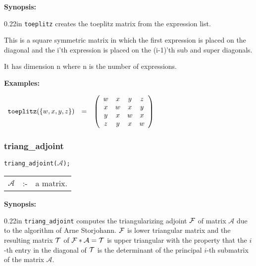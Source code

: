 {\bf Synopsis:} %

\begin{addtolength}{\leftskip}{0.22in}
{\tt toeplitz} creates the toeplitz matrix from the 
                expression list. 

This is a square symmetric matrix in 
                which the first expression is placed on the diagonal 
                and the i'th expression is placed on the (i-1)'th sub 
                and super diagonals.

It has dimension n where n is the 
                number of expressions.

\end{addtolength}

{\bf Examples:}

\begin{flushleft}  
\hspace*{0.1in}
\begin{math}  
\begin{array}{ccc}
{\tt toeplitz}(\{w,x,y,z\}) & = & 
        \left( \begin{array}{cccc} w & x & y & z \\ x & w & x & y \\
      y & x & w & x \\ z & y & x & w
 \end{array} \right) 
\end{array}
\end{math}  
\end{flushleft}

\subsubsection{triang\_adjoint}
\label{linalg:triang_adjoint}
\hspace*{0.175in} {\tt triang\_adjoint($\mathcal{A}$);}

\hspace*{0.1in}
\begin{tabular}{l l l}
$\mathcal{A}$  &:-& a matrix.
\end{tabular}

{\bf Synopsis:} %


\begin{addtolength}{\leftskip}{0.22in}
{\tt triang\_adjoint} computes the triangularizing adjoint ${\cal F}$ of
matrix $\mathcal{A}$ due to the algorithm of Arne Storjohann. ${\cal F}$ is
lower triangular matrix and the resulting matrix ${\cal T}$ of
${\cal F * A = T}$ is upper triangular with the property that the $i$-th
entry in the diagonal of ${\cal T}$ is the determinant of the principal
$i$-th submatrix of the matrix $\mathcal{A}$.

\end{addtolength}

